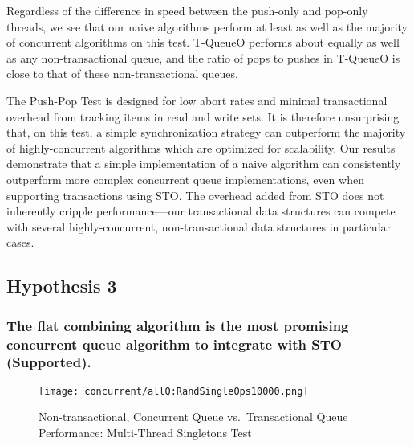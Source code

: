 Regardless of the difference in speed between the push-only and pop-only threads, we see that our naive algorithms perform at least as well as the majority of concurrent algorithms on this test. 
T-QueueO performs about equally as well as any non-transactional queue, and the ratio of pops to pushes in T-QueueO is close to that of these non-transactional queues.

The Push-Pop Test is designed for low abort rates and minimal transactional overhead from tracking items in read and write sets. It is therefore unsurprising that, on this test, a simple synchronization strategy can outperform the majority of highly-concurrent algorithms which are optimized for scalability. 
Our results demonstrate that a simple implementation of a naive algorithm can consistently outperform more complex concurrent queue implementations, even when supporting transactions using STO. The overhead added from STO does not inherently cripple performance---our transactional data structures can compete with several highly-concurrent, non-transactional data structures in particular cases. 

\vspace{12pt}
\noindent{}


\subsection{Hypothesis 3}
\subsubsection{The flat combining algorithm is the most promising concurrent queue algorithm to integrate with STO (Supported).}
\label{eval:hypo3}

\begin{figure}[t!]
    \centering
   	\begin{minipage}{\textwidth}
        {\texttt{[image: concurrent/allQ:RandSingleOps10000.png]}}
	\end{minipage}
    \caption{Non-transactional, Concurrent Queue vs.\ Transactional Queue Performance: Multi-Thread Singletons Test}
    \label{fig:ntqs}
\end{figure}

